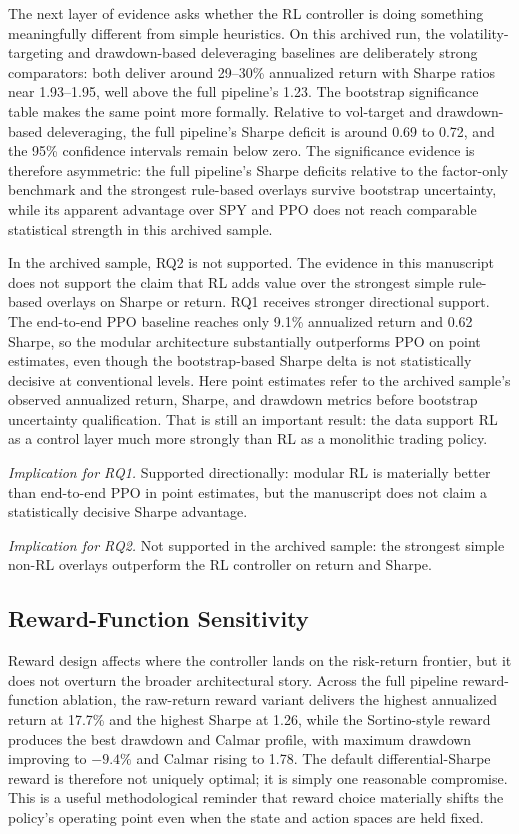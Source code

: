 \documentclass[10pt,twocolumn]{article}
\begin{document}
The next layer of evidence asks whether the RL controller is doing something
meaningfully different from simple heuristics. On this archived run, the
volatility-targeting and drawdown-based deleveraging baselines are deliberately
strong comparators: both deliver around 29--30\% annualized return with Sharpe
ratios near 1.93--1.95, well above the full pipeline's 1.23. The bootstrap
significance table makes the same point more formally. Relative to vol-target
and drawdown-based deleveraging, the full pipeline's Sharpe deficit is around
0.69 to 0.72, and the 95\% confidence intervals remain below zero. The
significance evidence is therefore asymmetric: the full pipeline's Sharpe
deficits relative to the factor-only benchmark and the strongest rule-based
overlays survive bootstrap uncertainty, while its apparent advantage over SPY
and PPO does not reach comparable statistical strength in this archived sample.

In the archived sample, RQ2 is not supported. The evidence in this manuscript
does not support the claim that RL adds value over the strongest simple
rule-based overlays on Sharpe or return. RQ1 receives stronger directional
support. The end-to-end PPO baseline reaches only 9.1\% annualized return and
0.62 Sharpe, so the modular architecture substantially outperforms PPO on point
estimates, even though the bootstrap-based Sharpe delta is not statistically
decisive at conventional levels. Here point estimates refer to the archived
sample's observed annualized return, Sharpe, and drawdown metrics before
bootstrap uncertainty qualification. That is still an important result: the data
support RL as a control layer much more strongly than RL as a monolithic
trading policy.

\noindent\textit{Implication for RQ1.} Supported directionally: modular RL is
materially better than end-to-end PPO in point estimates, but the manuscript
does not claim a statistically decisive Sharpe advantage.

\noindent\textit{Implication for RQ2.} Not supported in the archived sample: the
strongest simple non-RL overlays outperform the RL controller on return and
Sharpe.

\subsection{Reward-Function Sensitivity}

Reward design affects where the controller lands on the risk-return frontier,
but it does not overturn the broader architectural story. Across the full
pipeline reward-function ablation, the raw-return reward variant delivers the
highest annualized return at 17.7\% and the highest Sharpe at 1.26, while the
Sortino-style reward produces the best drawdown and Calmar profile, with
maximum drawdown improving to $-9.4\%$ and Calmar rising to 1.78. The default
differential-Sharpe reward is therefore not uniquely optimal; it is simply one
reasonable compromise. This is a useful methodological reminder that reward
choice materially shifts the policy's operating point even when the state and
action spaces are held fixed.
\end{document}
